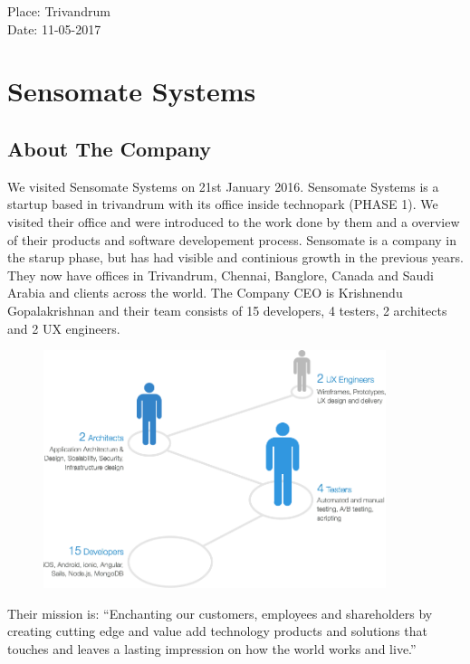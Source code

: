 \documentclass[a4paper,12pt]{report}
\begin{document}
\begin{titlepage}
		\begin{flushleft}
		Place: Trivandrum\\
		Date:  11-05-2017\\
		\end{flushleft}
		\vfill %
	\end{titlepage}

	
	\newpage
	\tableofcontents
	\newpage

	\chapter{Sensomate Systems}
		\section{About The Company}
		We visited Sensomate Systems on 21st January 2016. Sensomate Systems is a startup based in trivandrum with its office inside technopark (PHASE 1). We visited their office and were introduced to the work done by them and a overview of their products and software developement process. Sensomate is a company in the starup phase, but has had visible and continious growth in the previous years. They now have offices in Trivandrum, Chennai, Banglore, Canada and Saudi Arabia and clients across the world. The Company CEO is Krishnendu Gopalakrishnan and their team consists of 15 developers, 4 testers, 2 architects and 2 UX engineers.  
		\begin{figure}[!ht]
					\begin{centering}
						\includegraphics[width=10cm]{images/team.png}\\
					\end{centering}
				\end{figure}
		Their mission is: ``Enchanting our customers, employees and shareholders by creating cutting edge and value add technology products and solutions that touches and leaves a lasting impression on how the world works and live.''
\end{document}
